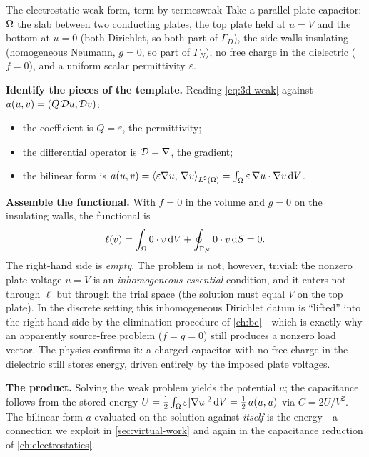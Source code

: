 \begin{workedexample}{The electrostatic weak form, term by term}{esweak}
Take a parallel-plate capacitor: $\Omega$ the slab between two conducting plates,
the top plate held at $u=V$ and the bottom at $u=0$ (both Dirichlet, so both part
of $\Gamma_D$), the side walls insulating (homogeneous Neumann, $g=0$, so part of
$\Gamma_N$), no free charge in the dielectric ($f=0$), and a uniform scalar
permittivity $\varepsilon$.

\medskip\noindent\textbf{Identify the pieces of the template.}
Reading \cref{eq:3d-weak} against $a(u,v)=(Q\,\mathcal{D} u,\mathcal{D} v)$:
\begin{itemize}\setlength\itemsep{1pt}
  \item the coefficient is $Q=\varepsilon$, the permittivity;
  \item the differential operator is $\mathcal{D}=\nabla$, the gradient;
  \item the bilinear form is $a(u,v)=\left\langle \varepsilon\nabla u,\, \nabla v\right\rangle_{L^2(\Omega)}=\int_\Omega\varepsilon\,\nabla u\cdot\nabla v\,\mathrm{d}V$.
\end{itemize}

\medskip\noindent\textbf{Assemble the functional.}
With $f=0$ in the volume and $g=0$ on the insulating walls, the functional is
\[
  \ell(v) = \int_\Omega 0\cdot v\,\mathrm{d}V + \oint_{\Gamma_N} 0\cdot v\,\mathrm{d}S = 0.
\]
The right-hand side is \emph{empty}. The problem is not, however, trivial: the
nonzero plate voltage $u=V$ is an \emph{inhomogeneous essential} condition, and
it enters not through $\ell$ but through the trial space (the solution must equal
$V$ on the top plate). In the discrete setting this inhomogeneous Dirichlet datum
is ``lifted'' into the right-hand side by the elimination procedure of
\cref{ch:bc}---which is exactly why an apparently source-free problem
($f=g=0$) still produces a nonzero load vector. The physics confirms it: a
charged capacitor with no free charge in the dielectric still stores energy,
driven entirely by the imposed plate voltages.

\medskip\noindent\textbf{The product.}
Solving the weak problem yields the potential $u$; the capacitance follows from
the stored energy $U=\tfrac12\int_\Omega\varepsilon\lvert\nabla u\rvert^2\,\mathrm{d}V =
\tfrac12\,a(u,u)$ via $C = 2U/V^2$. The bilinear form $a$ evaluated on the
solution against \emph{itself} is the energy---a connection we exploit in
\cref{sec:virtual-work} and again in the capacitance reduction of
\cref{ch:electrostatics}.
\end{workedexample}

